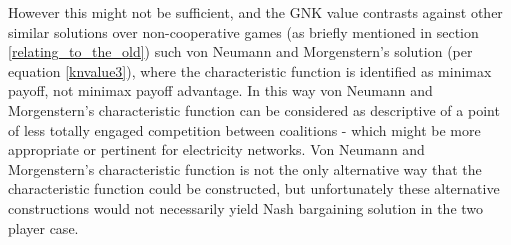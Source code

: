 However this might not be sufficient, and the GNK value contrasts against other similar solutions over non-cooperative games (as briefly mentioned in section \ref{relating_to_the_old}) such von Neumann and Morgenstern's solution (per equation \ref{knvalue3}), where the characteristic function is identified as minimax payoff, not minimax payoff advantage.
In this way von Neumann and Morgenstern's characteristic function can be considered as descriptive of a point of less totally engaged competition between coalitions - which might be more appropriate or pertinent for electricity networks.
Von Neumann and Morgenstern's characteristic function is not the only alternative way that the characteristic function could be constructed, but unfortunately these alternative constructions would not necessarily yield Nash bargaining solution in the two player case.







